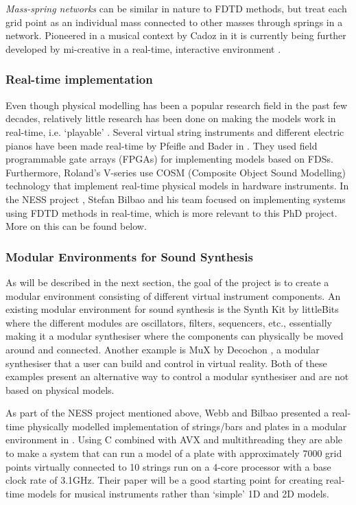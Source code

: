 \\
\\
\textit{Mass-spring networks} can be similar in nature to FDTD methods, but treat each grid point as an individual mass connected to other masses through springs in a network. Pioneered in a musical context by Cadoz in \cite{Cadoz1979, Cadoz1983, Cadoz1993} it is currently being further developed by mi-creative in a real-time, interactive environment \cite{Villeneuve2019, Leonard2019}. 

\subsubsection*{Real-time implementation}
Even though physical modelling has been a popular research field in the past few decades, relatively little research has been done on making the models work in real-time, i.e. `playable’ \cite{Mehes2016}. Several virtual string instruments and different electric pianos have been made real-time by Pfeifle and Bader in \cite{Pfeifle2012, Pfeifle2015, Pfeifle2017}. They used field programmable gate arrays (FPGAs) for implementing models based on FDSs. Furthermore, Roland’s V-series use COSM (Composite Object Sound Modelling) technology \cite{Bybee2019} that implement real-time physical models in hardware instruments. In the NESS project \cite{NESS2016}, Stefan Bilbao and his team focused on implementing systems using FDTD methods in real-time, which is more relevant to this PhD project. More on this can be found below.

\subsubsection*{Modular Environments for Sound Synthesis}

As will be described in the next section, the goal of the project is to create a modular environment consisting of different virtual instrument components. An existing modular environment for sound synthesis is the Synth Kit by littleBits \cite{littleBits2019} where the different modules are oscillators, filters, sequencers, etc., essentially making it a modular synthesiser where the components can physically be moved around and connected. Another example is MuX by Decochon \cite{MuX2019}, a modular synthesiser that a user can build and control in virtual reality. Both of these examples present an alternative way to control a modular synthesiser and are not based on physical models.

As part of the NESS project mentioned above, Webb and Bilbao presented a real-time physically modelled implementation of strings/bars and plates in a modular environment in \cite{Webb2015}. Using C combined with AVX and multithreading they are able to make a system that can run a model of a plate with approximately 7000 grid points virtually connected to 10 strings run on a 4-core processor with a base clock rate of 3.1GHz. Their paper will be a good starting point for creating real-time models for musical instruments rather than ‘simple’ 1D and 2D models.


